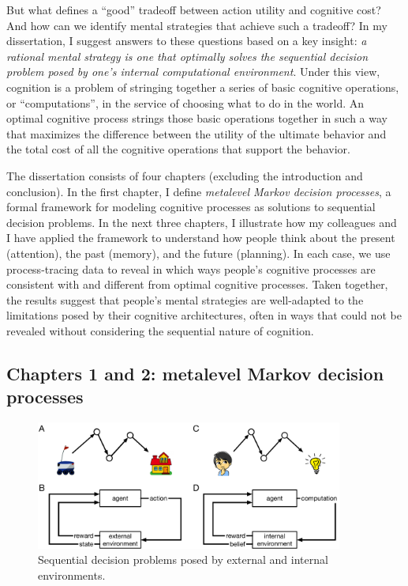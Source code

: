 \documentclass[12pt,a4paperpaper,]{article}
\begin{document}
But what defines a ``good'' tradeoff between action utility and cognitive cost? And how can we identify mental strategies that achieve such a tradeoff? In my dissertation, I suggest answers to these questions based on a key insight: \emph{a rational mental strategy is one that optimally solves the sequential decision problem posed by one's internal computational environment}. Under this view, cognition is a problem of stringing together a series of basic cognitive operations, or ``computations'', in the service of choosing what to do in the world. An optimal cognitive process strings those basic operations together in such a way that maximizes the difference between the utility of the ultimate behavior and the total cost of all the cognitive operations that support the behavior.

The dissertation consists of four chapters (excluding the introduction and conclusion). In the first chapter, I define \emph{metalevel Markov decision processes}, a formal framework for modeling cognitive processes as solutions to sequential decision problems. In the next three chapters, I illustrate how my colleagues and I have applied the framework to understand how people think about the present (attention), the past (memory), and the future (planning). In each case, we use process-tracing data to reveal in which ways people's cognitive processes are consistent with and different from optimal cognitive processes. Taken together, the results suggest that people's mental strategies are well-adapted to the limitations posed by their cognitive architectures, often in ways that could not be revealed without considering the sequential nature of cognition.


\subsection{Chapters 1 and 2: metalevel Markov decision processes}\label{formal-framework-metalevel-mdps}


\begin{figure}[tb]
  \centering
  \includegraphics[width=0.9\textwidth]{diagrams/sequential-intuition.pdf}
  \caption{Sequential decision problems posed by external and internal environments.}
  \label{fig:sequential-intuition}
\end{figure}
\end{document}
